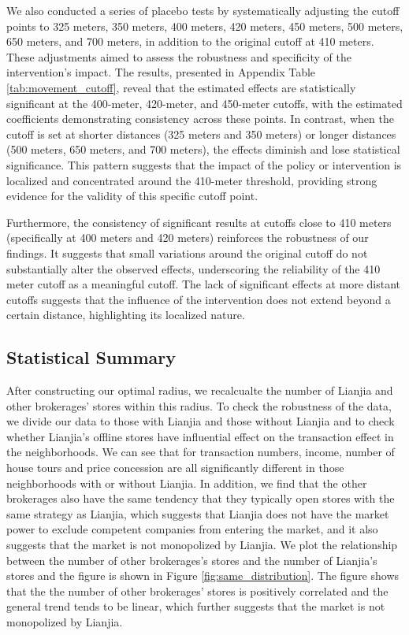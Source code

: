 \documentclass[11pt]{article}
\begin{document}
We also conducted a series of placebo tests by systematically adjusting the cutoff points to 325 meters, 350 meters, 400 meters, 420 meters, 450 meters, 500 meters, 650 meters, and 700 meters, in addition to the original cutoff at 410 meters. These adjustments aimed to assess the robustness and specificity of the intervention's impact. The results, presented in Appendix Table \ref{tab:movement_cutoff}, reveal that the estimated effects are statistically significant at the 400-meter, 420-meter, and 450-meter cutoffs, with the estimated coefficients demonstrating consistency across these points. In contrast, when the cutoff is set at shorter distances (325 meters and 350 meters) or longer distances (500 meters, 650 meters, and 700 meters), the effects diminish and lose statistical significance. This pattern suggests that the impact of the policy or intervention is localized and concentrated around the 410-meter threshold, providing strong evidence for the validity of this specific cutoff point.

Furthermore, the consistency of significant results at cutoffs close to 410 meters (specifically at 400 meters and 420 meters) reinforces the robustness of our findings. It suggests that small variations around the original cutoff do not substantially alter the observed effects, underscoring the reliability of the 410 meter cutoff as a meaningful cutoff. The lack of significant effects at more distant cutoffs suggests that the influence of the intervention does not extend beyond a certain distance, highlighting its localized nature.

\subsection{Statistical Summary} \label{subsec:Statistical_Summary}

After constructing our optimal radius, we recalcualte the number of Lianjia and other brokerages' stores within this radius. To check the robustness of the data, we divide our data to those with Lianjia and those without Lianjia and to check whether Lianjia's offline stores have influential effect on the transaction effect in the neighborhoods. We can see that for transaction numbers, income, number of house tours and price concession are all significantly different in those neighborhoods with or without Lianjia. In addition, we find that the other brokerages also have the same tendency that they typically open stores with the same strategy as Lianjia, which suggests that Lianjia does not have the market power to exclude competent companies from entering the market, and it also suggests that the market is not monopolized by Lianjia. We plot the relationship between the number of other brokerages's stores and the number of Lianjia's stores and the figure is shown in Figure \ref{fig:same_distribution}. The figure shows that the the number of other brokerages' stores is positively correlated and the general trend tends to be linear, which further suggests that the market is not monopolized by Lianjia.
\end{document}
